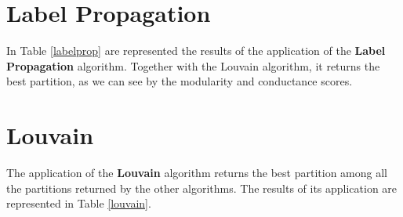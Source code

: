 
\section{Label Propagation} %
\label{sec:label_propagation}
    In Table \ref{labelprop} are represented the results of the application of the \textbf{Label Propagation}
    algorithm. Together with the Louvain algorithm, it returns the best partition, as we can see by the modularity
    and conductance scores.

    \begin{table}[H]
        \centering
        \begin{subtable}{\textwidth}
        \end{subtable}
        \caption{Evaluation of the partition obtained by the application of the Label Propagaion algorithm.}
        \label{labelprop}
    \end{table}


\section{Louvain} %
\label{sec:louvain}
    The application of the \textbf{Louvain} algorithm returns the best partition among all the partitions returned
    by the other algorithms. The results of its application are represented in Table \ref{louvain}.

    \begin{table}[H]
        \centering
        \begin{subtable}{\textwidth}
        \end{subtable}
        \caption{Evaluation of the partition obtained by the application of the Louvain algorithm.}
        \label{louvain}
    \end{table}

